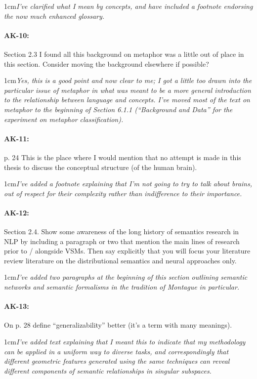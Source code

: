 \documentclass[11pt,a4paper]{article}
\newcommand{\res}[1]{\vspace{0.25cm} \begin{adjustwidth}{1cm}{}\emph{#1}\end{adjustwidth}}
\begin{document}
\res{I've clarified what I mean by concepts, and have included a footnote endorsing the now much enhanced glossary.}

\paragraph{AK-10:} Section 2.3 I found all this background on metaphor was a little out of place in this section. Consider moving the background elsewhere if possible?

\res{Yes, this is a good point and now clear to me; I got a little too drawn into the particular issue of metaphor in what was meant to be a more general introduction to the relationship between language and concepts.  I've moved most of the text on metaphor to the beginning of Section 6.1.1 (``Background and Data'' for the experiment on metaphor classification).}

\paragraph{AK-11:} p. 24 This is the place where I would mention that no attempt is made in this thesis to discuss the conceptual structure (of the human brain).

\res{I've added a footnote explaining that I'm not going to try to talk about brains, out of respect for their complexity rather than indifference to their importance.}

\paragraph{AK-12:} Section 2.4. Show some awareness of the long history of semantics research in NLP by including a paragraph or two that mention the main lines of research prior to / alongside VSMs. Then say explicitly that you will focus your literature review literature on the distributional semantics and neural approaches only.

\res{I've added two paragraphs at the beginning of this section outlining semantic networks and semantic formalisms in the tradition of Montague in particular.}

\paragraph{AK-13:} On p. 28 define “generalizability” better (it’s a term with many meanings).

\res{I've added text explaining that I meant this to indicate that my methodology can be applied in a uniform way to diverse tasks, and correspondingly that different geometric features generated using the same techniques can reveal different components of semantic relationships in singular subspaces.}
\end{document}
